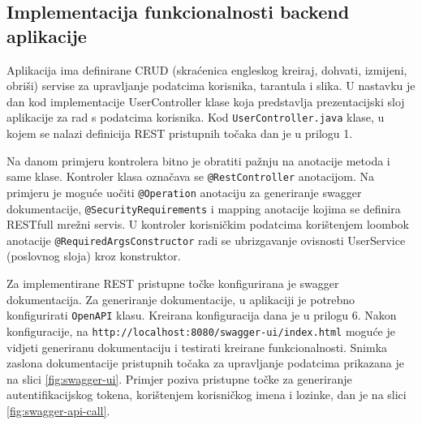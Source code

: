 \documentclass[a4paper,12pt,oneside]{article}
\begin{document}
\subsection{Implementacija funkcionalnosti backend aplikacije}

Aplikacija ima definirane CRUD (skraćenica engleskog kreiraj, dohvati, izmijeni, obriši) servise za upravljanje podatcima korisnika, tarantula i slika. U nastavku je dan kod implementacije UserController klase koja predstavlja prezentacijski sloj aplikacije za rad s podatcima korisnika. Kod \texttt{UserController.java} klase, u kojem se nalazi definicija REST pristupnih točaka dan je u prilogu 1.




Na danom primjeru kontrolera bitno je obratiti pažnju na anotacije metoda i same klase. Kontroler klasa označava se \texttt{@RestController} anotacijom. Na primjeru je moguće uočiti \texttt{@Operation} anotaciju za generiranje swagger dokumentacije, \texttt{@SecurityRequirements} i mapping anotacije kojima se definira RESTfull mrežni servis. U kontroler korisničkim podatcima korištenjem loombok anotacije \texttt{@RequiredArgsConstructor} radi se ubrizgavanje ovisnosti UserService (poslovnog sloja) kroz konstruktor.

Za implementirane REST pristupne točke konfigurirana je swagger dokumentacija. Za generiranje dokumentacije, u aplikaciji je potrebno konfigurirati \texttt{OpenAPI} klasu. Kreirana konfiguracija dana je u prilogu 6. Nakon konfiguracije, na \texttt{http://localhost:8080/swagger-ui\-/index.html} moguće je vidjeti generiranu dokumentaciju i testirati kreirane funkcionalnosti. Snimka zaslona dokumentacije pristupnih točaka za upravljanje podatcima prikazana je na slici \ref{fig:swagger-ui}. Primjer poziva pristupne točke za generiranje autentifikacijskog tokena, korištenjem korisničkog imena i lozinke, dan je na slici \ref{fig:swagger-api-call}.
\end{document}
